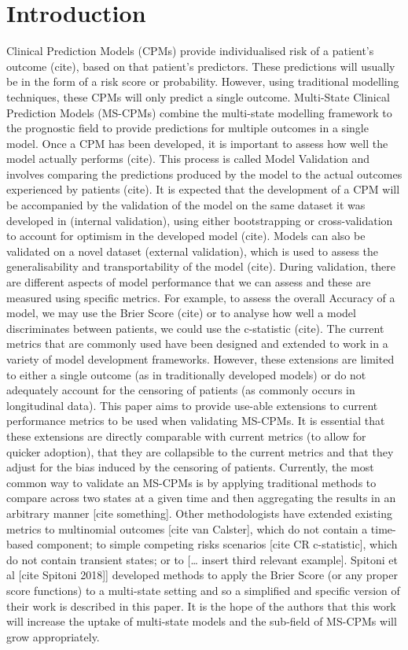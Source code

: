 \documentclass[12pt,twoside]{reedthesis}
\begin{document}
\hypertarget{introduction-3}{%
\section{Introduction}\label{introduction-3}}

Clinical Prediction Models (CPMs) provide individualised risk of a patient's outcome (cite), based on that patient's predictors. These predictions will usually be in the form of a risk score or probability. However, using traditional modelling techniques, these CPMs will only predict a single outcome. Multi-State Clinical Prediction Models (MS-CPMs) combine the multi-state modelling framework to the prognostic field to provide predictions for multiple outcomes in a single model.
Once a CPM has been developed, it is important to assess how well the model actually performs (cite). This process is called Model Validation and involves comparing the predictions produced by the model to the actual outcomes experienced by patients (cite). It is expected that the development of a CPM will be accompanied by the validation of the model on the same dataset it was developed in (internal validation), using either bootstrapping or cross-validation to account for optimism in the developed model (cite). Models can also be validated on a novel dataset (external validation), which is used to assess the generalisability and transportability of the model (cite).
During validation, there are different aspects of model performance that we can assess and these are measured using specific metrics. For example, to assess the overall Accuracy of a model, we may use the Brier Score (cite) or to analyse how well a model discriminates between patients, we could use the c-statistic (cite). The current metrics that are commonly used have been designed and extended to work in a variety of model development frameworks. However, these extensions are limited to either a single outcome (as in traditionally developed models) or do not adequately account for the censoring of patients (as commonly occurs in longitudinal data).
This paper aims to provide use-able extensions to current performance metrics to be used when validating MS-CPMs. It is essential that these extensions are directly comparable with current metrics (to allow for quicker adoption), that they are collapsible to the current metrics and that they adjust for the bias induced by the censoring of patients.
Currently, the most common way to validate an MS-CPMs is by applying traditional methods to compare across two states at a given time and then aggregating the results in an arbitrary manner {[}cite something{]}. Other methodologists have extended existing metrics to multinomial outcomes {[}cite van Calster{]}, which do not contain a time-based component; to simple competing risks scenarios {[}cite CR c-statistic{]}, which do not contain transient states; or to {[}\ldots{} insert third relevant example{]}. Spitoni et al {[}cite Spitoni 2018{]}{]} developed methods to apply the Brier Score (or any proper score functions) to a multi-state setting and so a simplified and specific version of their work is described in this paper.
It is the hope of the authors that this work will increase the uptake of multi-state models and the sub-field of MS-CPMs will grow appropriately.
\end{document}
